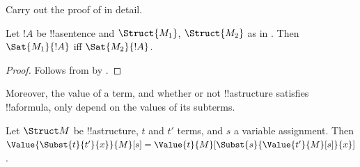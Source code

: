 \begin{prob}
Carry out the proof of  in
detail.
\end{prob}

\begin{cor}
  Let $!A$ be !!a{sentence} and $\Struct{M_1}$, $\Struct{M_2}$ as in
  . Then $\Sat{M_1}{!A}$ iff $\Sat{M_2}{!A}$.
\end{cor}

\begin{proof}
Follows from  by .
\end{proof}

Moreover, the value of a term, and whether or not !!a{structure}
satisfies !!a{formula}, only depend on the values of its subterms.

\begin{prop}
Let $\Struct M$ be !!a{structure}, $t$ and $t'$ terms, and $s$ a
variable assignment. Then $\Value{\Subst{t}{t'}{x}}{M}[s] =
\Value{t}{M}[\Subst{s}{\Value{t'}{M}[s]}{x}]$.
\end{prop}

